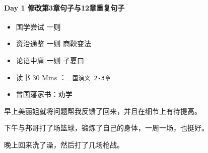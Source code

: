 \documentclass[UTF8,a4paper,8pt]{ctexart}
\begin{document}
 	 \paragraph{Day 1   修改第3章句子与12章重复句子    \quad     }
	 	 \begin{itemize}[itemindent = 1em]
	 	 	\renewcommand\labelitemi{\makebox[0pt][l]{$\square$}\raisebox{.15ex}{\hspace{0.1em}$\checkmark$}}		

	 	 	
	 	 	
	 	 	\renewcommand\labelitemi{\makebox[0pt][l]{$\square$}\hspace{1em}}
	 	 	\item   国学尝试 一则 
	 	 	\item 	资治通鉴 一则 商鞅变法
	 	 	\item 	论语中庸 一则 子夏曰
	 	 	\item   读书  30 Mins	：\verb|三国演义 2-3章|
	 	 	\item   曾国藩家书：劝学
	 	 \end{itemize}
		早上美丽姐就将问题帮我反馈了回来，并且在细节上有待提高。
	
		下午与邦哥打了场篮球，锻炼了自己的身体，一周一场，也挺好。
		
		晚上回来洗了澡，然后打了几场枪战。
\end{document}
